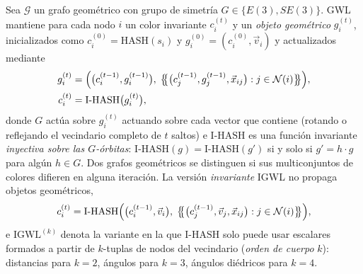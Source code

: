 \begin{definition}\label{def:gwl}
	Sea $\mathcal{G}$ un grafo geométrico con grupo de simetría $G \in \{E(3), SE(3)\}$. GWL mantiene para cada nodo $i$ un color invariante $c_i^{(t)}$ y un \textit{objeto geométrico} $g_i^{(t)}$, inicializados como $c_i^{(0)} = \mathrm{HASH}(s_i)$ y $g_i^{(0)} = (c_i^{(0)}, \vec{v}_i)$ y actualizados mediante
	\begin{align}
		g_i^{(t)} &= \Bigl( \bigl(c_i^{(t-1)}, g_i^{(t-1)}\bigr),\; \bigl\{\!\!\bigl\{ \bigl(c_j^{(t-1)}, g_j^{(t-1)}, \vec{x}_{ij}\bigr) : j \in \mathcal{N}(i) \bigr\}\!\!\bigr\} \Bigr), \label{eq:gwl_geometrico}\\
		c_i^{(t)} &= \mathrm{I\text{-}HASH}\bigl(g_i^{(t)}\bigr), \label{eq:gwl_color}
	\end{align}
	donde $G$ actúa sobre $g_i^{(t)}$ actuando sobre cada vector que contiene (rotando o reflejando el vecindario completo de $t$ saltos) e $\mathrm{I\text{-}HASH}$ es una función invariante \textit{inyectiva sobre las $G$-órbitas}: $\mathrm{I\text{-}HASH}(g) = \mathrm{I\text{-}HASH}(g')$ si y solo si $g' = h \cdot g$ para algún $h \in G$. Dos grafos geométricos se distinguen si sus multiconjuntos de colores difieren en alguna iteración. La versión \textit{invariante} IGWL no propaga objetos geométricos,
	\begin{equation}\label{eq:igwl}
		c_i^{(t)} = \mathrm{I\text{-}HASH}\Bigl( \bigl(c_i^{(t-1)}, \vec{v}_i\bigr),\; \bigl\{\!\!\bigl\{ \bigl(c_j^{(t-1)}, \vec{v}_j, \vec{x}_{ij}\bigr) : j \in \mathcal{N}(i) \bigr\}\!\!\bigr\} \Bigr),
	\end{equation}
	e $\mathrm{IGWL}^{(k)}$ denota la variante en la que $\mathrm{I\text{-}HASH}$ solo puede usar escalares formados a partir de $k$-tuplas de nodos del vecindario (\textit{orden de cuerpo} $k$): distancias para $k = 2$, ángulos para $k = 3$, ángulos diédricos para $k = 4$.
\end{definition}


